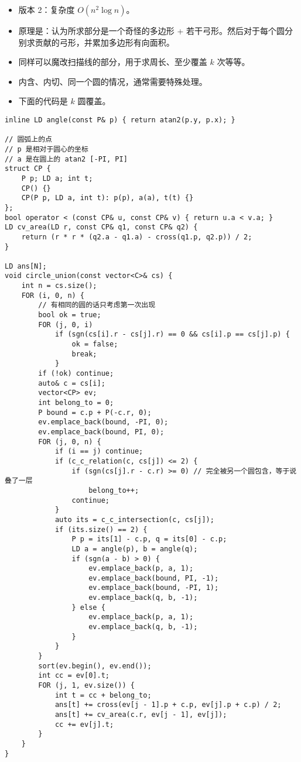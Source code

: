 \documentclass[]{article}
\providecommand{\tightlist}{%
  \setlength{\itemsep}{0pt}\setlength{\parskip}{0pt}}
\begin{document}
\begin{itemize}
\tightlist
\item
  版本 2：复杂度 \(O(n^2 \log n)\)。
\item
  原理是：认为所求部分是一个奇怪的多边形 +
  若干弓形。然后对于每个圆分别求贡献的弓形，并累加多边形有向面积。
\item
  同样可以魔改扫描线的部分，用于求周长、至少覆盖 \(k\) 次等等。
\item
  内含、内切、同一个圆的情况，通常需要特殊处理。
\item
  下面的代码是 \(k\) 圆覆盖。
\end{itemize}

\begin{verbatim}
inline LD angle(const P& p) { return atan2(p.y, p.x); }

// 圆弧上的点
// p 是相对于圆心的坐标
// a 是在圆上的 atan2 [-PI, PI]
struct CP {
    P p; LD a; int t;
    CP() {}
    CP(P p, LD a, int t): p(p), a(a), t(t) {}
};
bool operator < (const CP& u, const CP& v) { return u.a < v.a; }
LD cv_area(LD r, const CP& q1, const CP& q2) {
    return (r * r * (q2.a - q1.a) - cross(q1.p, q2.p)) / 2;
}

LD ans[N];
void circle_union(const vector<C>& cs) {
    int n = cs.size();
    FOR (i, 0, n) {
        // 有相同的圆的话只考虑第一次出现
        bool ok = true;
        FOR (j, 0, i)
            if (sgn(cs[i].r - cs[j].r) == 0 && cs[i].p == cs[j].p) {
                ok = false;
                break;
            }
        if (!ok) continue;
        auto& c = cs[i];
        vector<CP> ev;
        int belong_to = 0;
        P bound = c.p + P(-c.r, 0);
        ev.emplace_back(bound, -PI, 0);
        ev.emplace_back(bound, PI, 0);
        FOR (j, 0, n) {
            if (i == j) continue;
            if (c_c_relation(c, cs[j]) <= 2) {
                if (sgn(cs[j].r - c.r) >= 0) // 完全被另一个圆包含，等于说叠了一层
                    belong_to++;
                continue;
            }
            auto its = c_c_intersection(c, cs[j]);
            if (its.size() == 2) {
                P p = its[1] - c.p, q = its[0] - c.p;
                LD a = angle(p), b = angle(q);
                if (sgn(a - b) > 0) {
                    ev.emplace_back(p, a, 1);
                    ev.emplace_back(bound, PI, -1);
                    ev.emplace_back(bound, -PI, 1);
                    ev.emplace_back(q, b, -1);
                } else {
                    ev.emplace_back(p, a, 1);
                    ev.emplace_back(q, b, -1);
                }
            }
        }
        sort(ev.begin(), ev.end());
        int cc = ev[0].t;
        FOR (j, 1, ev.size()) {
            int t = cc + belong_to;
            ans[t] += cross(ev[j - 1].p + c.p, ev[j].p + c.p) / 2;
            ans[t] += cv_area(c.r, ev[j - 1], ev[j]);
            cc += ev[j].t;
        }
    }
}
\end{verbatim}
\end{document}
